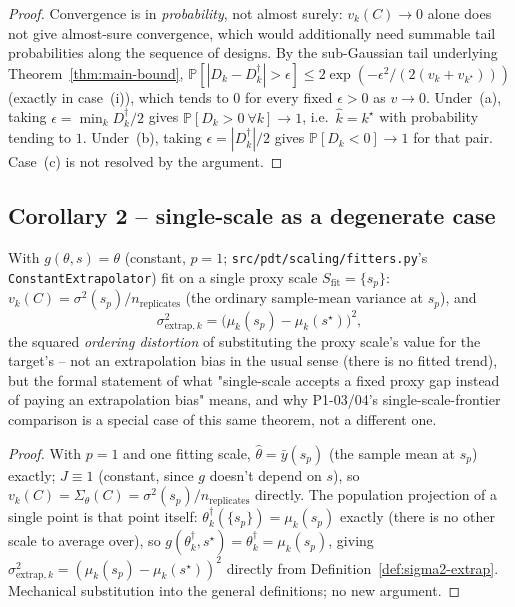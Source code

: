 \begin{proof}
Convergence is in \emph{probability}, not almost surely: $v_k(C) \to 0$ alone does not
give almost-sure convergence, which would additionally need summable tail probabilities
along the sequence of designs. By the sub-Gaussian tail underlying
Theorem~\ref{thm:main-bound}, $\mathbb{P}[|D_k - D_k^\dagger| > \epsilon] \le
2\exp(-\epsilon^2 / (2(v_k + v_{k^\star})))$ (exactly in case~(i)), which tends to $0$
for every fixed $\epsilon > 0$ as $v \to 0$. Under~(a), taking $\epsilon = \min_k
D_k^\dagger / 2$ gives $\mathbb{P}[D_k > 0 \ \forall k] \to 1$, i.e.\ $\hat{k} = k^\star$
with probability tending to $1$. Under~(b), taking $\epsilon = |D_k^\dagger|/2$ gives
$\mathbb{P}[D_k < 0] \to 1$ for that pair. Case~(c) is not resolved by the argument.
\end{proof}

\subsection{Corollary 2 -- single-scale as a degenerate case}
\label{sec:corollary2}

\begin{corollary}
\label{cor:single-scale}
With $g(\theta, s) = \theta$ (constant, $p=1$; \texttt{src/pdt/scaling/fitters.py}'s
\texttt{ConstantExtrapolator}) fit on a single proxy scale $S_{\mathrm{fit}} = \{s_p\}$:
$v_k(C) = \sigma^2(s_p) / n_{\mathrm{replicates}}$ (the ordinary sample-mean variance at
$s_p$), and
\[
  \sigma^2_{\mathrm{extrap}, k} = \big( \mu_k(s_p) - \mu_k(s^\star) \big)^2,
\]
the squared \emph{ordering distortion} of substituting the proxy scale's value for the
target's -- not an extrapolation bias in the usual sense (there is no fitted trend),
but the formal statement of what "single-scale accepts a fixed proxy gap instead of
paying an extrapolation bias" means, and why P1-03/04's single-scale-frontier
comparison is a special case of this same theorem, not a different one.
\end{corollary}

\begin{proof}
With $p=1$ and one fitting scale, $\hat\theta = \bar{y}(s_p)$ (the sample mean at
$s_p$) exactly; $J \equiv 1$ (constant, since $g$ doesn't depend on $s$), so
$v_k(C) = \Sigma_\theta(C) = \sigma^2(s_p)/n_{\mathrm{replicates}}$ directly. The
population projection of a single point is that point itself:
$\theta_k^\dagger(\{s_p\}) = \mu_k(s_p)$ exactly (there is no other scale to average
over), so $g(\theta_k^\dagger, s^\star) = \theta_k^\dagger = \mu_k(s_p)$, giving
$\sigma^2_{\mathrm{extrap}, k} = (\mu_k(s_p) - \mu_k(s^\star))^2$ directly from
Definition~\ref{def:sigma2-extrap}. Mechanical substitution into the general
definitions; no new argument.
\end{proof}

